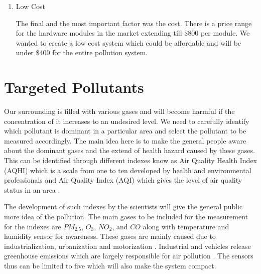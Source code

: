 \begin {enumerate}
\item {Low Cost}

The final and the most important factor was the cost. There is a price range for the hardware modules in the market extending till $\$800 $ per module. We wanted to create a low cost system which could be affordable and will be under $\$400$ for the entire pollution system.
\end{enumerate}


\section{Targeted Pollutants}

Our surrounding is filled with various gases and will become harmful if the concentration of it increases to an undesired level. We need to carefully identify which pollutant is dominant in a particular area and select the pollutant to be measured accordingly. The main idea here is to make the general people aware about the dominant gases and the extend of health hazard caused by these gases. This can be identified through different indexes know as Air Quality Health Index  (AQHI) which is a scale from one to ten developed by health and environmental professionals \cite{faq} and Air Quality Index (AQI) which gives the level of air quality status in an area \cite{Asha2017}.



\par 

The development of such indexes by the scientists will give the general public more idea of the pollution. The main gases to be included for the measurement for the indexes are  $PM_{2.5}$, $O_3$, $NO_2$, and $CO$ along with temperature and humidity sensor for awareness. These gases are mainly caused due to industrialization, urbanization and motorization \cite{Saha1952}. Industrial and vehicles release greenhouse emissions which are largely responsible for air pollution \cite{ internet}. The sensors thus can be limited to five which will also make the system compact.

